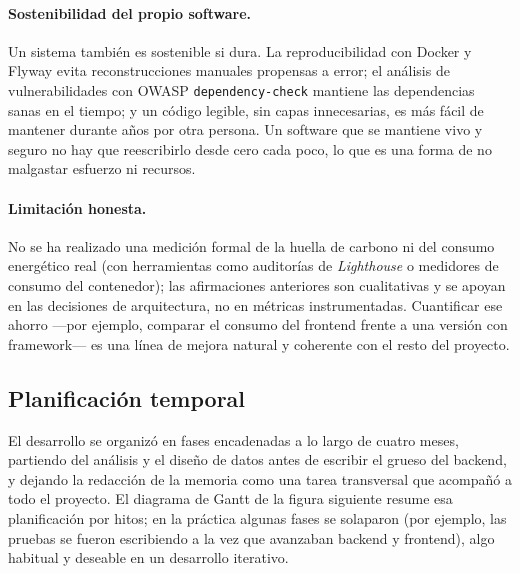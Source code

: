 \documentclass[12pt,a4paper]{report}
\begin{document}
\paragraph{Sostenibilidad del propio software.} Un sistema también es sostenible si dura. La reproducibilidad con Docker y Flyway evita reconstrucciones manuales propensas a error; el análisis de vulnerabilidades con OWASP \texttt{dependency-check} mantiene las dependencias sanas en el tiempo; y un código legible, sin capas innecesarias, es más fácil de mantener durante años por otra persona. Un software que se mantiene vivo y seguro no hay que reescribirlo desde cero cada poco, lo que es una forma de no malgastar esfuerzo ni recursos.

\paragraph{Limitación honesta.} No se ha realizado una medición formal de la huella de carbono ni del consumo energético real (con herramientas como auditorías de \emph{Lighthouse} o medidores de consumo del contenedor); las afirmaciones anteriores son cualitativas y se apoyan en las decisiones de arquitectura, no en métricas instrumentadas. Cuantificar ese ahorro —por ejemplo, comparar el consumo del frontend frente a una versión con framework— es una línea de mejora natural y coherente con el resto del proyecto.

\subsection{Planificación temporal}

El desarrollo se organizó en fases encadenadas a lo largo de cuatro meses, partiendo del análisis y el diseño de datos antes de escribir el grueso del backend, y dejando la redacción de la memoria como una tarea transversal que acompañó a todo el proyecto. El diagrama de Gantt de la figura siguiente resume esa planificación por hitos; en la práctica algunas fases se solaparon (por ejemplo, las pruebas se fueron escribiendo a la vez que avanzaban backend y frontend), algo habitual y deseable en un desarrollo iterativo.
\end{document}
